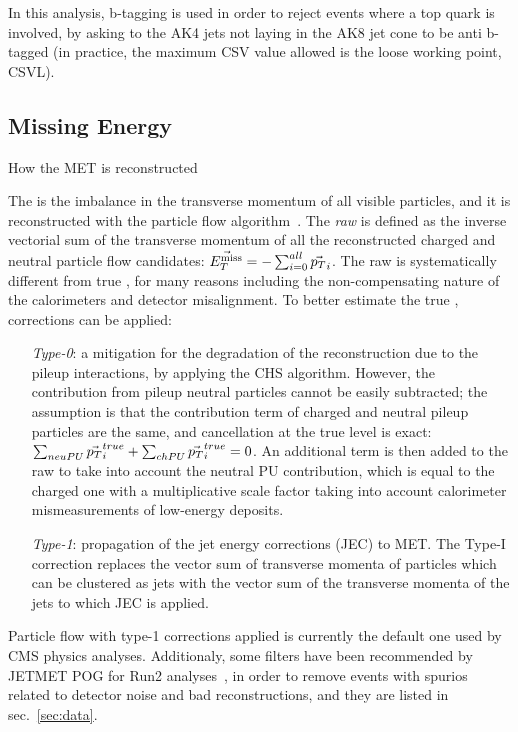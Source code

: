 In this analysis, b-tagging is used in order to reject events where a top quark is involved, by asking to the AK4 jets not laying in the AK8 jet cone to be anti b-tagged (in practice, the maximum CSV value allowed is the loose working point, CSVL).

\subsection{Missing Energy}
{\color{red} How the MET is reconstructed}
 
The \MET is the imbalance in the transverse momentum of all visible particles, and it is reconstructed with the particle flow algorithm~\cite{bib:PF1}. The \emph{raw} \MET is defined as the inverse vectorial sum of the transverse momentum of all the reconstructed charged and neutral particle flow candidates: $\vec{E_T^{\text{miss}}}= - \sum_{i=0}^{all} \vec{p_T}_i$.
The raw \MET is systematically different from true \MET, for many reasons including the non-compensating nature of the calorimeters and detector misalignment. To better estimate the true \MET, corrections can be applied:
\begin{itemize}
   \item[\emph{Type-0}:] a mitigation for the degradation of the \MET reconstruction due to the pileup interactions, by applying the CHS algorithm. However, the \MET contribution from pileup neutral particles cannot be easily subtracted; the assumption is that the \MET contribution term of charged and neutral pileup particles are the same, and cancellation at the true level is exact: $\sum_{neuPU} \vec{p_T}_i^{true} + \sum_{chPU} \vec{p_T}_i^{true} = 0$. An additional \MET term is then added to the raw \MET to take into account the neutral PU contribution, which is equal to the charged one with a multiplicative scale factor taking into account calorimeter mismeasurements of low-\pt energy deposits.
   \item[\emph{Type-1}:] propagation of the jet energy corrections (JEC) to MET. The Type-I correction replaces the vector sum of transverse momenta of particles which can be clustered as jets with the vector sum of the transverse momenta of the jets to which JEC is applied. 
 \end{itemize}
% 
Particle flow \MET with type-1 corrections applied is currently the default one used by CMS physics analyses. Additionaly, some \MET filters have been recommended by JETMET POG for Run2 analyses~\cite{JetMETPOG}, in order to remove events with spurios \MET related to detector noise and bad reconstructions, and they are listed in sec.~\ref{sec:data}.
